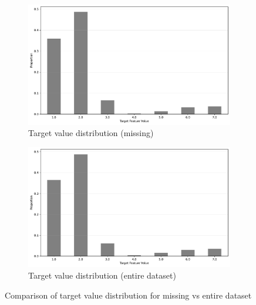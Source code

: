 \documentclass[11pt]{article}
\begin{document}
\begin{figure}[H]
	\centering
	\begin{subfigure}[b]{0.48\textwidth}
		\centering
		\includegraphics[width=\textwidth]{images/target_feature_distribution_missing.pdf}
		\caption{Target value distribution (missing)}
		\label{fig:target_dist_missing}
	\end{subfigure}
	\hfill
	\begin{subfigure}[b]{0.48\textwidth}
		\centering
		\includegraphics[width=\textwidth]{images/target_feature_distribution_entire.pdf}
		\caption{Target value distribution (entire dataset)}
		\label{fig:target_dist_entire}
	\end{subfigure}
	\caption{Comparison of target value distribution for missing vs entire dataset}
	\label{fig:target_dist}
\end{figure}
\end{document}
